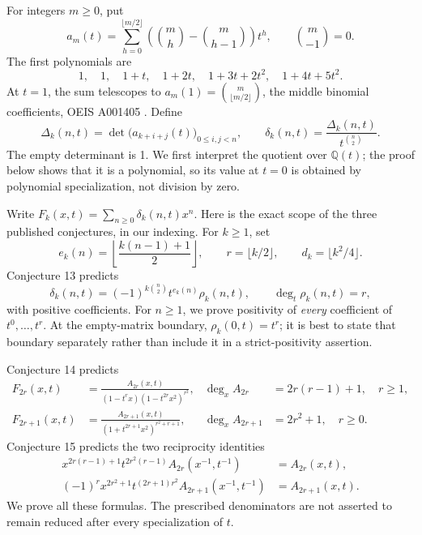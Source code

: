 \documentclass[11pt,letterpaper]{article}
\numberwithin{equation}{section}
\theoremstyle{definition}
\newcommand{\Q}{\mathbb Q}
\begin{document}
For integers \(m\ge0\), put
\begin{equation}\label{eq:ballot}
 a_m(t)=\sum_{h=0}^{\lfloor m/2\rfloor}
 \left(\binom mh-\binom m{h-1}\right)t^h,
 \qquad \binom m{-1}=0.
\end{equation}
The first polynomials are
\[
 1,\quad 1,\quad 1+t,\quad 1+2t,\quad
 1+3t+2t^2,\quad 1+4t+5t^2.
\]
At \(t=1\), the sum telescopes to
\(a_m(1)=\binom m{\lfloor m/2\rfloor}\), the middle binomial
coefficients, OEIS A001405 \cite{OEIS1405}.
Define
\begin{equation}\label{eq:hankel}
 \Delta_k(n,t)=\det\bigl(a_{k+i+j}(t)\bigr)_{0\le i,j<n},
 \qquad
 \delta_k(n,t)=\frac{\Delta_k(n,t)}{t^{\binom n2}}.
\end{equation}
The empty determinant is 1. We first interpret the quotient over
\(\Q(t)\); the proof below shows that it is a polynomial, so its value
at \(t=0\) is obtained by polynomial specialization, not division by zero.

Write \(F_k(x,t)=\sum_{n\ge0}\delta_k(n,t)x^n\).
Here is the exact scope of the three published conjectures, in our indexing.
For \(k\ge1\), set
\begin{equation}\label{eq:e-d}
 e_k(n)=\left\lfloor\frac{k(n-1)+1}{2}\right\rfloor,
 \qquad r=\lfloor k/2\rfloor,
 \qquad d_k=\lfloor k^2/4\rfloor.
\end{equation}
Conjecture 13 predicts
\begin{equation}\label{eq:c13}
 \delta_k(n,t)=(-1)^{k\binom n2}t^{e_k(n)}\rho_k(n,t),
 \qquad \deg_t\rho_k(n,t)=r,
\end{equation}
with positive coefficients. For \(n\ge1\), we prove positivity of
\emph{every} coefficient of \(t^0,\ldots,t^r\).
At the empty-matrix boundary, \(\rho_k(0,t)=t^r\); it is best to state
that boundary separately rather than include it in a strict-positivity
assertion.

Conjecture 14 predicts
\begin{align}
 F_{2r}(x,t)&=
 \frac{A_{2r}(x,t)}{(1-t^r x)(1-t^{2r}x^2)^{r^2}},
 &\deg_x A_{2r}&=2r(r-1)+1, \quad r\ge1,\label{eq:c14even}\\
 F_{2r+1}(x,t)&=
 \frac{A_{2r+1}(x,t)}{(1+t^{2r+1}x^2)^{r^2+r+1}},
 &\deg_x A_{2r+1}&=2r^2+1, \quad r\ge0.\label{eq:c14odd}
\end{align}
Conjecture 15 predicts the two reciprocity identities
\begin{align}
 x^{2r(r-1)+1}t^{2r^2(r-1)}
 A_{2r}(x^{-1},t^{-1})&=A_{2r}(x,t),\label{eq:c15even}\\
 (-1)^r x^{2r^2+1}t^{(2r+1)r^2}
 A_{2r+1}(x^{-1},t^{-1})&=A_{2r+1}(x,t).\label{eq:c15odd}
\end{align}
We prove all these formulas. The prescribed denominators are not asserted
to remain reduced after every specialization of \(t\).
\end{document}
